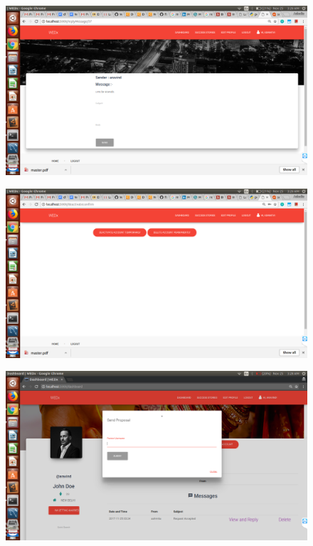 \documentclass[12pt]{report}
\begin{document}
\begin{figure}[!htb]
    \centering
    \includegraphics[width=1\textwidth]{sc-18.png}
\end{figure}

\begin{figure}[!htb]
    \centering
    \includegraphics[width=1\textwidth]{sc-19.png}
\end{figure}

\begin{figure}[!htb]
    \centering
    \includegraphics[width=1\textwidth]{sc-20.png}
\end{figure}
\end{document}
